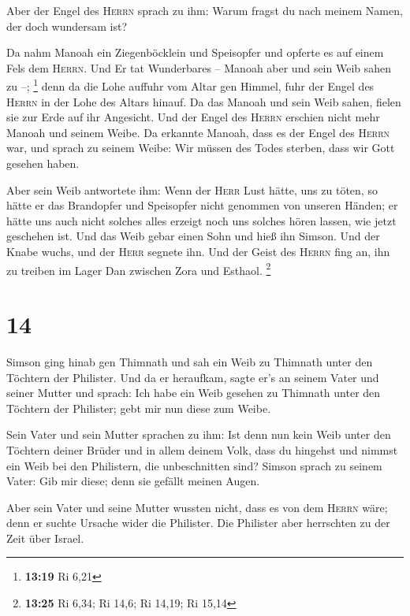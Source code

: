  Aber der Engel des \textsc{Herrn} sprach zu ihm: Warum
fragst du nach meinem Namen, der doch wundersam ist?

 Da nahm Manoah ein Ziegenböcklein und Speisopfer und
opferte es auf einem Fels dem \textsc{Herrn}. Und Er tat Wunderbares --
Manoah aber und sein Weib sahen zu --; \footnote{\textbf{13:19} Ri 6,21}
 denn da die Lohe auffuhr vom Altar gen Himmel, fuhr der
Engel des \textsc{Herrn} in der Lohe des Altars hinauf. Da das Manoah
und sein Weib sahen, fielen sie zur Erde auf ihr Angesicht.
 Und der Engel des \textsc{Herrn} erschien nicht mehr
Manoah und seinem Weibe. Da erkannte Manoah, dass es der Engel des
\textsc{Herrn} war,  und sprach zu seinem Weibe: Wir
müssen des Todes sterben, dass wir Gott gesehen haben.

 Aber sein Weib antwortete ihm: Wenn der \textsc{Herr}
Lust hätte, uns zu töten, so hätte er das Brandopfer und Speisopfer
nicht genommen von unseren Händen; er hätte uns auch nicht solches alles
erzeigt noch uns solches hören lassen, wie jetzt geschehen ist.
 Und das Weib gebar einen Sohn und hieß ihn Simson. Und
der Knabe wuchs, und der \textsc{Herr} segnete ihn.  Und
der Geist des \textsc{Herrn} fing an, ihn zu treiben im Lager Dan
zwischen Zora und Esthaol. \footnote{\textbf{13:25} Ri 6,34; Ri 14,6; Ri
  14,19; Ri 15,14}

\hypertarget{section-5}{%
\section{14}\label{section-5}}

 Simson ging hinab gen Thimnath und sah ein Weib zu
Thimnath unter den Töchtern der Philister.  Und da er
heraufkam, sagte er's an seinem Vater und seiner Mutter und sprach: Ich
habe ein Weib gesehen zu Thimnath unter den Töchtern der Philister; gebt
mir nun diese zum Weibe.

 Sein Vater und sein Mutter sprachen zu ihm: Ist denn nun
kein Weib unter den Töchtern deiner Brüder und in allem deinem Volk,
dass du hingehst und nimmst ein Weib bei den Philistern, die
unbeschnitten sind? Simson sprach zu seinem Vater: Gib mir diese; denn
sie gefällt meinen Augen.

 Aber sein Vater und seine Mutter wussten nicht, dass es
von dem \textsc{Herrn} wäre; denn er suchte Ursache wider die Philister.
Die Philister aber herrschten zu der Zeit über Israel.

